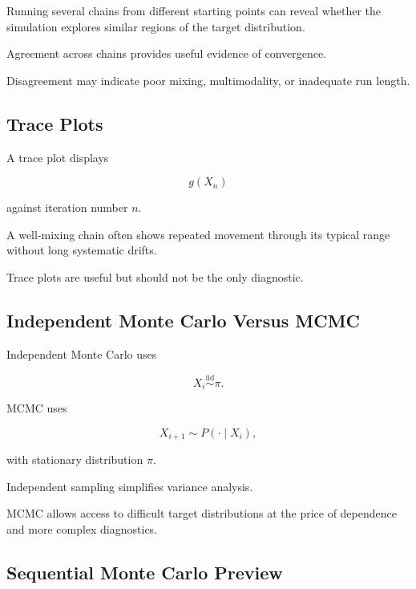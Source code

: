 Running several chains from different starting points can reveal whether
the simulation explores similar regions of the target distribution.

Agreement across chains provides useful evidence of convergence.

Disagreement may indicate poor mixing, multimodality, or inadequate run
length.

\subsection{Trace Plots}
\label{subsec:mcmc-trace-plots}

A trace plot displays

\[
g(X_n)
\]

against iteration number \(n\).

A well-mixing chain often shows repeated movement through its typical
range without long systematic drifts.

Trace plots are useful but should not be the only diagnostic.

\subsection{Independent Monte Carlo Versus MCMC}
\label{subsec:independent-mc-vs-mcmc}

Independent Monte Carlo uses

\[
\boxed{
X_i
\overset{\mathrm{iid}}{\sim}
\pi.
}
\]

MCMC uses

\[
\boxed{
X_{i+1}
\sim
P(\cdot\mid X_i),
}
\]

with stationary distribution \(\pi\).

Independent sampling simplifies variance analysis.

MCMC allows access to difficult target distributions at the price of
dependence and more complex diagnostics.

\subsection{Sequential Monte Carlo Preview}
\label{subsec:sequential-monte-carlo}

